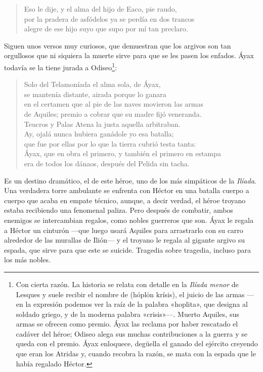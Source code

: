 \begin{verse}
Eso le dije, y el alma del hijo de Eaco, pie raudo,\\
por la pradera de asfódelos ya se perdía en dos trancos\\
alegre de ese hijo suyo que supo por mí tan preclaro.
\end{verse}

Siguen unos versos muy curiosos, que demuestran que los argivos son tan orgullosos que ni siquiera la muerte sirve para que se les pasen los enfados. Áyax todavía se la tiene jurada a Odiseo\footnote{Con cierta razón. La historia se relata con detalle en la \emph{Ilíada menor} de Lesques y suele recibir el nombre de  (hóplōn krísis), el juicio de las armas ---en la expresión podemos ver la raíz de la palabra «hoplita», que designa al soldado griego, y de la moderna palabra «crisis»---. Muerto Aquiles, sus armas se ofrecen como premio. Áyax las reclama por haber rescatado el cadáver del héroe; Odiseo alega sus muchas contribuciones a la guerra y se queda con el premio. Áyax enloquece, degüella el ganado del ejército creyendo que eran los Atridas y, cuando recobra la razón, se mata con la espada que le había regalado Héctor.}:


\begin{verse}
Solo del Telamoníada el alma sola, de Áyax,\\
se mantenía distante, airada porque lo ganara\\
en el certamen que al pie de las naves movieron las armas\\
de Aquiles; premio a cobrar que su madre fijó veneranda.\\
Teucros y Palas Atena la justa aquella arbitraban.\\
Ay, ojalá nunca hubiera ganádole yo esa batalla;\\
que fue por ellas por lo que la tierra cubrió testa tanta:\\
Áyax, que en obra el primero, y también el primero en estampa\\
era de todos los dánaos, después del Pelida sin tacha.
\end{verse}

Es un destino dramático, el de este héroe, uno de los más simpáticos de la \emph{Ilíada}. Una verdadera torre ambulante se enfrenta con Héctor en una batalla cuerpo a cuerpo que acaba en empate técnico, aunque, a decir verdad, el héroe troyano estaba recibiendo una fenomenal paliza. Pero después de combatir, ambos enemigos se intercambian regalos, como nobles guerreros que son. Áyax le regala a Héctor un cinturón ---que luego usará Aquiles para arrastrarlo con su carro alrededor de las murallas de Ilión--- y el troyano le regala al gigante argivo su espada, que sirve para que este se suicide. Tragedia sobre tragedia, incluso para los más nobles.

